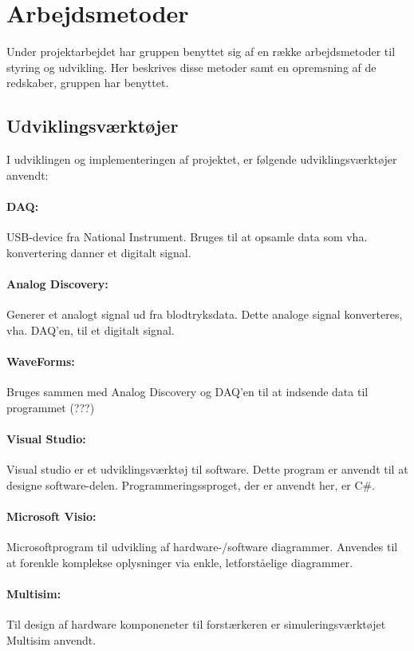 \chapter{Arbejdsmetoder}\label{kapitel_Arbejdsmetoder}
Under projektarbejdet har gruppen benyttet sig af en række arbejdsmetoder til styring og udvikling.
Her beskrives disse metoder samt en opremsning af de redskaber, gruppen har benyttet.


\section{Udviklingsværktøjer} %
I udviklingen og implementeringen af projektet, er følgende udviklingsværktøjer anvendt:
\subsubsection{DAQ:}
USB-device fra National Instrument. Bruges til at opsamle data som vha. konvertering danner et digitalt signal.
\subsubsection{Analog Discovery:}
Generer et analogt signal ud fra blodtryksdata. Dette analoge signal konverteres, vha. DAQ'en, til et digitalt signal.
\subsubsection{WaveForms:}
Bruges sammen med Analog Discovery og DAQ'en til at indsende data til programmet (???)
\subsubsection{Visual Studio:}
Visual studio er et udviklingsværktøj til software. Dette program er anvendt til at designe software-delen. Programmeringssproget, der er anvendt her, er C$\#$. 
\subsubsection{Microsoft Visio:}
Microsoftprogram til udvikling af hardware-/software diagrammer. Anvendes til at forenkle komplekse oplysninger via enkle, letforståelige diagrammer.
\subsubsection{Multisim:}
Til design af hardware komponeneter til forstærkeren er simuleringsværktøjet Multisim anvendt. 
